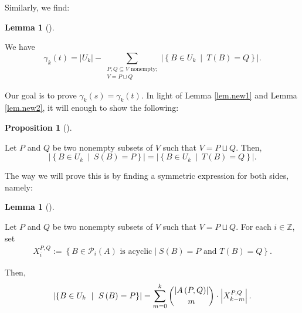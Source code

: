 \documentclass[numbers=enddot,12pt,final,onecolumn,notitlepage]{scrartcl}%
\theoremstyle{definition}
\newtheorem{lem}[theo]{Lemma}
\newenvironment{lemma}[1][]
{\begin{lem}[#1]\begin{leftbar}}
{\end{leftbar}\end{lem}}
\newtheorem{prop}[theo]{Proposition}
\newenvironment{proposition}[1][]
{\begin{prop}[#1]\begin{leftbar}}
{\end{leftbar}\end{prop}}
\let\sumnonlimits\sum
\renewcommand{\sum}{\sumnonlimits\limits}
\theoremstyle{plainsl}
\begin{document}
Similarly, we find:

\begin{lemma}
\label{lem.new2}We have%
\[
\gamma_{k}\left(  t\right)  =\left\vert U_{k}\right\vert -\sum
_{\substack{P,Q\subseteq V\text{ nonempty;}\\V=P\sqcup Q}}\left\vert \left\{
B\in U_{k}\ \mid\ T\left(  B\right)  =Q\right\}  \right\vert .
\]

\end{lemma}

Our goal is to prove $\gamma_{k}\left(  s\right)  =\gamma_{k}\left(  t\right)
$. In light of Lemma \ref{lem.new1} and Lemma \ref{lem.new2}, it will enough
to show the following:

\begin{proposition}
\label{prop.new3}Let $P$ and $Q$ be two nonempty subsets of $V$ such that
$V=P\sqcup Q$. Then,%
\[
\left\vert \left\{  B\in U_{k}\ \mid\ S\left(  B\right)  =P\right\}
\right\vert =\left\vert \left\{  B\in U_{k}\ \mid\ T\left(  B\right)
=Q\right\}  \right\vert .
\]

\end{proposition}

The way we will prove this is by finding a symmetric expression for both
sides, namely:

\begin{lemma}
\label{lem.new4}Let $P$ and $Q$ be two nonempty subsets of $V$ such that
$V=P\sqcup Q$.
For each $i \in \mathbb{Z}$, set
\begin{align*}
    X_i^{P,Q} := \left\{B \in \mathcal{P}_i(A) \text{ is acyclic} \mid S(B) = P \text{ and } T(B) = Q\right\}.
\end{align*}


Then,%
\[
\left\vert \left\{  B\in U_{k}\ \mid\ S\left(  B\right)  =P\right\}
\right\vert =\sum_{m=0}^{k}\dbinom{\left\vert A\left(  P,Q\right)  \right\vert
}{m}\cdot\left\vert X_{k-m}^{P,Q}\right\vert .
\]

\end{lemma}
\end{document}
